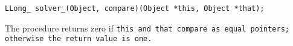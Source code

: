 
\tt{LLong_ solver_(Object, compare)(Object *this, Object *that);}


The procedure returns zero if \tt{this} and \tt{that} compare
as equal pointers; otherwise the return value is one.
